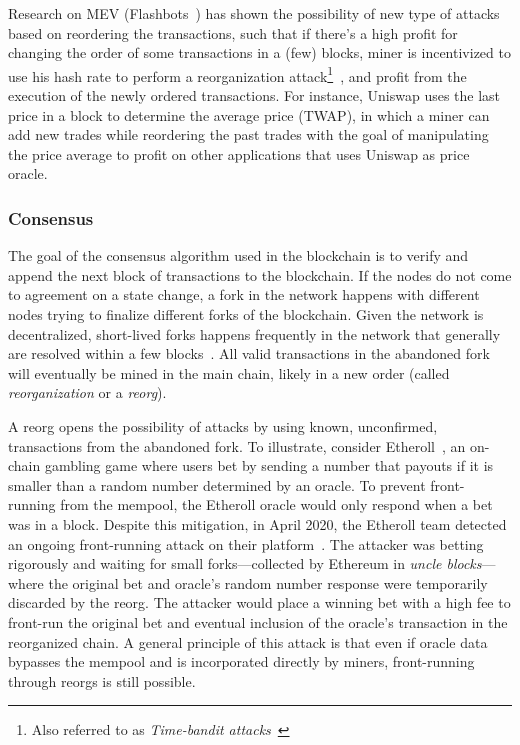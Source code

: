 Research on MEV (\eg Flashbots~\cite{flashbots}) has shown the possibility of new type of attacks based on reordering the transactions, such that if there's a high profit for changing the order of some transactions in a (few) blocks, miner is incentivized to use his hash rate to perform a reorganization attack\footnote{Also referred to as \textit{Time-bandit attacks}~\cite{daian2020flash}}~\cite{lin2017survey}, and profit from the execution of the newly ordered transactions. For instance, Uniswap uses the last price in a block to determine the average price (TWAP), in which a miner can add new trades while reordering the past trades with the goal of manipulating the price average to profit on other applications that uses Uniswap as price oracle. 

\subsubsection{Consensus} \label{consensus}

The goal of the consensus algorithm used in the blockchain is to verify and append the next block of transactions to the blockchain. If the nodes do not come to agreement on a state change, a fork in the network happens with different nodes trying to finalize different forks of the blockchain. Given the network is decentralized, short-lived forks happens frequently in the network that generally are resolved within a few blocks~\cite{neudecker2019short}. All valid transactions in the abandoned fork will eventually be mined in the main chain, likely in a new order (called \textit{reorganization} or a \textit{reorg}). 

A reorg opens the possibility of attacks by using known, unconfirmed, transactions from the abandoned fork. To illustrate, consider Etheroll~\cite{etheroll}, an on-chain gambling game where users bet by sending a number that payouts if it is smaller than a random number determined by an oracle. To prevent front-running from the mempool, the Etheroll oracle would only respond when a bet was in a block. Despite this mitigation, in April 2020, the Etheroll team detected an ongoing front-running attack on their platform~\cite{etherollincident}. The attacker was betting rigorously and waiting for small forks---collected by Ethereum in \textit{uncle blocks}---where the original bet and oracle's random number response were temporarily discarded by the reorg. The attacker would place a winning bet with a high fee to front-run the original bet and eventual inclusion of the oracle's transaction in the reorganized chain. A general principle of this attack is that even if oracle data bypasses the mempool and is incorporated directly by miners, front-running through reorgs is still possible. 

